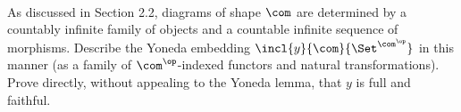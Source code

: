 \documentclass[../../main]{subfiles}
\begin{document}
\maketitle

\paragraph{}
\begin{exercise}
	As discussed in Section 2.2, diagrams of shape \(\com\) are determined
	by a countably infinite family of objects and a countable infinite sequence
	of morphisms. Describe the Yoneda embedding
	\(\incl{y}{\com}{\Set^{\com^\op}}\) in this manner (as a family of
	\(\com^\op\)-indexed functors and natural transformations). Prove
	directly, without appealing to the Yoneda lemma, that \(y\) is full and
	faithful.
\end{exercise}
\end{document}
